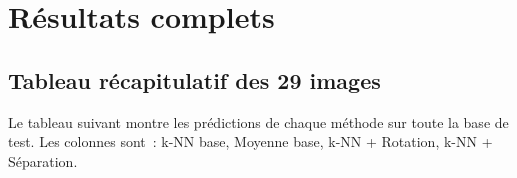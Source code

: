 \documentclass[a4paper,11pt]{article}
\begin{document}

\section{Résultats complets}

\subsection{Tableau récapitulatif des 29 images}

Le tableau suivant montre les prédictions de chaque méthode sur toute la base de test. Les colonnes sont~: k-NN base, Moyenne base, k-NN + Rotation, k-NN + Séparation.
\end{document}
